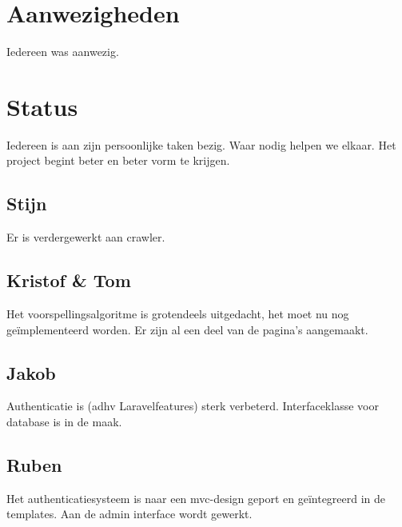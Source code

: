 \documentclass[11pt, a4paper]{article}
\begin{document}
\title{}
\author{Groep A\\ Week 5}
\date{13 maart 2014}
\maketitle

\section{Aanwezigheden}
Iedereen was aanwezig.
\section{Status}
Iedereen is aan zijn persoonlijke taken bezig. Waar nodig helpen we elkaar. Het project begint beter en beter vorm te krijgen.	
\subsection{Stijn}
Er is verdergewerkt aan crawler.
\subsection{Kristof \& Tom}
Het voorspellingsalgoritme is grotendeels uitgedacht, het moet nu nog ge\"implementeerd worden. Er zijn al een deel van de pagina's aangemaakt.
\subsection{Jakob}
Authenticatie is (adhv Laravelfeatures) sterk verbeterd. Interfaceklasse voor database is in de maak.
\subsection{Ruben}
Het authenticatiesysteem is naar een mvc-design geport en ge\"integreerd in de templates. Aan de admin interface wordt gewerkt.
\end{document}
